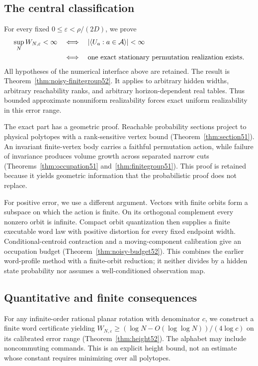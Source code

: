 \subsection{The central classification}
For every fixed $0\le\varepsilon<\rho/(2D)$, we prove
\begin{align*}
 \sup_N W_{N,\varepsilon}<\infty
 &\quad\Longleftrightarrow\quad |\langle U_a:a\in\mathcal A\rangle|<\infty\\
 &\quad\Longleftrightarrow\quad
 \text{one exact stationary permutation realization exists}.
\end{align*}
All hypotheses of the numerical interface above are retained. The
result is Theorem~\ref{thm:noisy-finitegroup52}. It applies to arbitrary
hidden widths, arbitrary reachability ranks, and arbitrary
horizon-dependent real tables. Thus bounded approximate nonuniform
realizability forces exact uniform realizability in this error range.

The exact part has a geometric proof. Reachable probability sections
project to physical polytopes with a rank-sensitive vertex bound
(Theorem~\ref{thm:section51}). An invariant finite-vertex body carries
a faithful permutation action, while failure of invariance produces
volume growth across separated narrow cuts
(Theorems~\ref{thm:occupation51} and~\ref{thm:finitegroup51}).
This proof is retained because it yields geometric information that
the probabilistic proof does not replace.

For positive error, we use a different argument. Vectors with finite
orbits form a subspace on which the action is finite. On its orthogonal
complement every nonzero orbit is infinite. Compact orbit quantization
then supplies a finite executable word law with positive distortion
for every fixed endpoint width. Conditional-centroid contraction and
a moving-component calibration give an occupation budget
(Theorem~\ref{thm:noisy-budget52}). This combines the earlier word-profile
method with a finite-orbit reduction; it neither divides by a hidden
state probability nor assumes a well-conditioned observation map.

\subsection{Quantitative and finite consequences}
For any infinite-order rational planar rotation with denominator $c$,
we construct a finite word certificate yielding
$W_{N,\varepsilon}\ge(\log N-O(\log\log N))/(4\log c)$ on its
calibrated error range (Theorem~\ref{thm:height52}). The alphabet may
include noncommuting commands. This is an explicit height bound,
not an estimate whose constant requires minimizing over all polytopes.

